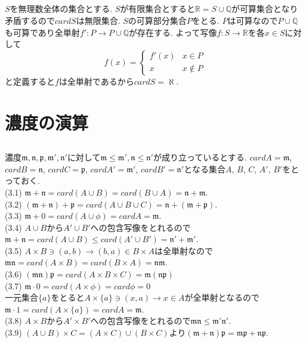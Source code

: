 \documentclass{jsarticle}
\begin{document}
\subsection{} %
$S$を無理数全体の集合とする. $S$が有限集合とすると$\mathbb{R} = S \cup \mathbb{Q}$が可算集合となり矛盾するので$card S$は無限集合. $S$の可算部分集合$P$をとる. $P$は可算なので$P \cup \mathbb{Q}$も可算であり全単射$f': P \rightarrow P \cup \mathbb{Q}$が存在する. よって写像$f: S \rightarrow \mathbb{R}$を各$x \in S$に対して
\begin{equation*}
	f(x) =
	\begin{cases}
		f'(x) & x \in P\\
		x & x \notin P
	\end{cases}
\end{equation*}
と定義すると$f$は全単射であるから$card S = \aleph$.


\section{濃度の演算} %
\subsection{} %
\noindent
濃度$\mathfrak{m}, \mathfrak{n}, \mathfrak{p}, \mathfrak{m'}, \mathfrak{n'}$に対して$\mathfrak{m} \le \mathfrak{m'}, \mathfrak{n} \le \mathfrak{n'}$が成り立っているとする.
$card A = \mathfrak{m}$, $card B = \mathfrak{n}$, $card C = \mathfrak{p}$, $card A' = \mathfrak{m}'$, $card B' = \mathfrak{n}'$となる集合$A$, $B$, $C$, $A'$, $B'$をとっておく.\\
(3.1) $\mathfrak{m} + \mathfrak{n} = card (A \cup B) = card (B \cup A) = \mathfrak{n} + \mathfrak{m}$.\\
(3.2) $(\mathfrak{m} + \mathfrak{n}) + \mathfrak{p} = card (A \cup B \cup C) = \mathfrak{n} + (\mathfrak{m} + \mathfrak{p})$.\\
(3.3) $\mathfrak{m} + 0 = card (A \cup \phi) = card A = \mathfrak{m}$.\\
(3.4) $A \cup B$から$A' \cup B'$への包含写像をとれるので$\mathfrak{m} + \mathfrak{n} = card (A \cup B) \leq card (A' \cup B') = \mathfrak{n'} + \mathfrak{m'}$.\\
(3.5) $A \times B \ni (a, b) \rightarrow (b, a) \in B \times A$は全単射なので$\mathfrak{mn} = card(A \times B) = card(B \times A) = \mathfrak{nm}$.\\
(3.6) $\mathfrak{(mn)p} = card(A \times B \times C) = \mathfrak{m(np)}$\\
(3.7) $\mathfrak{m} \cdot 0 = card(A \times \phi) = card \phi = 0$\\
$一元集合\{a\}$をとると$A \times \{a\} \ni (x, a) \rightarrow x \in A$が全単射となるので$\mathfrak{m} \cdot 1 = card(A \times \{a\}) = card A = \mathfrak{m}$.\\
(3.8) $A \times B$から$A' \times B'$への包含写像をとれるので$\mathfrak{mn} \le \mathfrak{m'n'}$.\\
(3.9) $(A \cup B) \times C = (A \times C) \cup (B \times C)$より$(\mathfrak{m} + \mathfrak{n}) \mathfrak{p} = \mathfrak{m} \mathfrak{p} + \mathfrak{n} \mathfrak{p}$.
\end{document}
